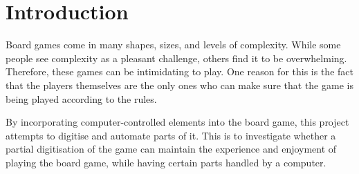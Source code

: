 \chapter{Introduction}\label{ch:introduction}
Board games come in many shapes, sizes, and levels of complexity. While some people see complexity as a pleasant challenge, others find it to be overwhelming. Therefore, these games can be intimidating to play. One reason for this is the fact that the players themselves are the only ones who can make sure that the game is being played according to the rules.

By incorporating computer-controlled elements into the board game, this project attempts to digitise and automate parts of it. This is to investigate whether a partial digitisation of the game can maintain the experience and enjoyment of playing the board game, while having certain parts handled by a computer.


